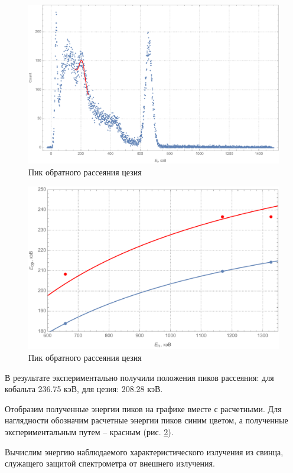 \documentclass[a4paper, 12pt]{article}
\begin{document}
\begin{figure}[!htb]
\centering
\includegraphics[scale=0.46]{cs137Reverse.pdf}
\caption{Пик обратного рассеяния цезия}
\label{fig:ce137Re}
\end{figure}
\begin{figure}[!htb]
\centering
\includegraphics[scale=0.6]{gotPeaks.pdf}
\caption{Пик обратного рассеяния цезия}
\label{fig:gotPeaks}
\end{figure}
\par
В результате экспериментально получили положения пиков рассеяния: для кобальта 236.75 кэВ, для цезия: 208.28 кэВ.\par
Отобразим полученные энергии пиков на графике вместе с расчетными. Для наглядности обозначим расчетные энергии пиков синим цветом, а полученные экспериментальным путем -- красным (рис. \ref{fig:gotPeaks}).\par
Вычислим энергию наблюдаемого характеристического излучения из свинца, служащего защитой спектрометра от внешнего излучения.\par
\end{document}
